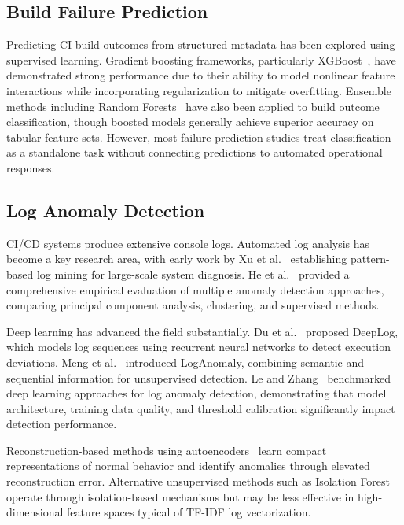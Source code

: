 \documentclass[conference]{IEEEtran}
\begin{document}
\subsection{Build Failure Prediction}

Predicting CI build outcomes from structured metadata has been explored using supervised learning. Gradient boosting frameworks, particularly XGBoost~\cite{chen2016xgboost}, have demonstrated strong performance due to their ability to model nonlinear feature interactions while incorporating regularization to mitigate overfitting. Ensemble methods including Random Forests~\cite{breiman2001random} have also been applied to build outcome classification, though boosted models generally achieve superior accuracy on tabular feature sets. However, most failure prediction studies treat classification as a standalone task without connecting predictions to automated operational responses.

\subsection{Log Anomaly Detection}

CI/CD systems produce extensive console logs. Automated log analysis has become a key research area, with early work by Xu et al.~\cite{xu2009logmining} establishing pattern-based log mining for large-scale system diagnosis. He et al.~\cite{he2016experience} provided a comprehensive empirical evaluation of multiple anomaly detection approaches, comparing principal component analysis, clustering, and supervised methods.

Deep learning has advanced the field substantially. Du et al.~\cite{du2017deeplog} proposed DeepLog, which models log sequences using recurrent neural networks to detect execution deviations. Meng et al.~\cite{meng2019loganomaly} introduced LogAnomaly, combining semantic and sequential information for unsupervised detection. Le and Zhang~\cite{le2022log} benchmarked deep learning approaches for log anomaly detection, demonstrating that model architecture, training data quality, and threshold calibration significantly impact detection performance.

Reconstruction-based methods using autoencoders~\cite{sakurada2014anomaly} learn compact representations of normal behavior and identify anomalies through elevated reconstruction error. Alternative unsupervised methods such as Isolation Forest~\cite{liu2008isolation} operate through isolation-based mechanisms but may be less effective in high-dimensional feature spaces typical of TF-IDF log vectorization.
\end{document}
